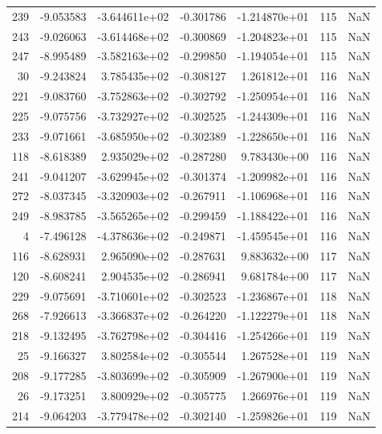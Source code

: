 \begin{tabular}{rrrrrrr}
 239 &  -9.053583 & -3.644611e+02 & -0.301786 & -1.214870e+01 &         115 & NaN \\
 243 &  -9.026063 & -3.614468e+02 & -0.300869 & -1.204823e+01 &         115 & NaN \\
 247 &  -8.995489 & -3.582163e+02 & -0.299850 & -1.194054e+01 &         115 & NaN \\
  30 &  -9.243824 &  3.785435e+02 & -0.308127 &  1.261812e+01 &         116 & NaN \\
 221 &  -9.083760 & -3.752863e+02 & -0.302792 & -1.250954e+01 &         116 & NaN \\
 225 &  -9.075756 & -3.732927e+02 & -0.302525 & -1.244309e+01 &         116 & NaN \\
 233 &  -9.071661 & -3.685950e+02 & -0.302389 & -1.228650e+01 &         116 & NaN \\
 118 &  -8.618389 &  2.935029e+02 & -0.287280 &  9.783430e+00 &         116 & NaN \\
 241 &  -9.041207 & -3.629945e+02 & -0.301374 & -1.209982e+01 &         116 & NaN \\
 272 &  -8.037345 & -3.320903e+02 & -0.267911 & -1.106968e+01 &         116 & NaN \\
 249 &  -8.983785 & -3.565265e+02 & -0.299459 & -1.188422e+01 &         116 & NaN \\
   4 &  -7.496128 & -4.378636e+02 & -0.249871 & -1.459545e+01 &         116 & NaN \\
 116 &  -8.628931 &  2.965090e+02 & -0.287631 &  9.883632e+00 &         117 & NaN \\
 120 &  -8.608241 &  2.904535e+02 & -0.286941 &  9.681784e+00 &         117 & NaN \\
 229 &  -9.075691 & -3.710601e+02 & -0.302523 & -1.236867e+01 &         118 & NaN \\
 268 &  -7.926613 & -3.366837e+02 & -0.264220 & -1.122279e+01 &         118 & NaN \\
 218 &  -9.132495 & -3.762798e+02 & -0.304416 & -1.254266e+01 &         119 & NaN \\
  25 &  -9.166327 &  3.802584e+02 & -0.305544 &  1.267528e+01 &         119 & NaN \\
 208 &  -9.177285 & -3.803699e+02 & -0.305909 & -1.267900e+01 &         119 & NaN \\
  26 &  -9.173251 &  3.800929e+02 & -0.305775 &  1.266976e+01 &         119 & NaN \\
 214 &  -9.064203 & -3.779478e+02 & -0.302140 & -1.259826e+01 &         119 & NaN \\

\end{tabular}
